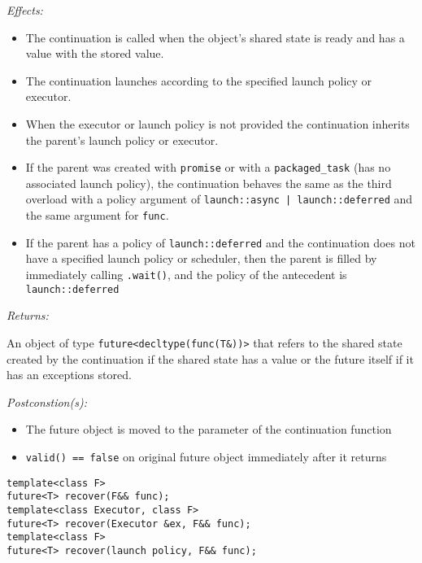 \documentclass[a4paper,10pt]{article}
\newcommand{\cpp}[1]{\lstinline{#1}}
\newcommand{\wordingItem}[1]{\noindent\textit{#1:}}
\newenvironment{wordingPara}{\begin{adjustwidth}{12pt}{}}{\end{adjustwidth}}
\newenvironment{Effects}{\wordingItem{Effects}\vspace{7pt}\noindent\begin{adjustwidth}{12pt}{}}{\vspace{7pt}\end{adjustwidth}}
\newenvironment{Returns}{\wordingItem{Returns}\vspace{7pt}\noindent\begin{adjustwidth}{12pt}{}}{\vspace{7pt}\end{adjustwidth}}
\newenvironment{Postconditions}{\wordingItem{Postconstion(s)}\vspace{7pt}\noindent\begin{adjustwidth}{12pt}{}}{\vspace{7pt}\end{adjustwidth}}
\begin{document}
\begin{wordingPara}

\begin{Effects}
\begin{itemize}

\item The continuation is called when the object's shared state is ready and has a value with the stored value. 
\item The continuation launches according to the specified launch policy or executor. 
\item When the executor or launch policy is not provided the continuation inherits the parent's 
launch policy or executor. 
\item If the parent was created with \cpp{promise} or with a \cpp{packaged_task} (has no associated launch 
policy), the continuation behaves the same as the third overload with a policy argument of 
\cpp{launch::async | launch::deferred} and the same argument for \cpp{func}.
 
\item If the parent has a policy of \cpp{launch::deferred} and the continuation does not have a specified 
launch policy or scheduler, then the parent is filled by immediately calling \cpp{.wait()}, and the 
policy of the antecedent is \cpp{launch::deferred} 

\end{itemize}
\end{Effects}

\begin{Returns}
An object of type \cpp{future<decltype(func(T&))>} that refers to the shared state created by 
the continuation if the shared state has a value or the future itself if it has an exceptions stored. 
\end{Returns}

\begin{Postconditions}
\begin{itemize}
\item The future object is moved to the parameter of the continuation function 
\item \cpp{valid() == false} on original future object immediately after it returns
\end{itemize}
\end{Postconditions}

\end{wordingPara}
\begin{lstlisting}[xleftmargin=0pt]
template<class F> 
future<T> recover(F&& func); 
template<class Executor, class F> 
future<T> recover(Executor &ex, F&& func); 
template<class F> 
future<T> recover(launch policy, F&& func);
\end{lstlisting}
\end{document}
